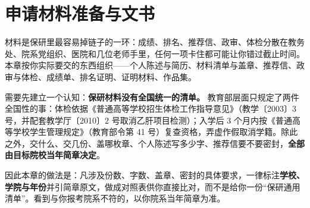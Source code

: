 \chapter{申请材料准备与文书}
\label{ch05}
\begin{keybox}
材料是保研里最容易掉链子的一环：成绩、排名、推荐信、政审、体检分散在教务处、院系党组织、医院和几位老师手里，任何一项卡住都可能让你错过截止时间。本章按你实际要交的东西组织——个人陈述与简历、材料清单与盖章、推荐信、政审与体检、成绩单、排名证明、证明材料、作品集。

需要先建立一个认知：\textbf{保研材料没有全国统一的清单。} 教育部层面只规定了两件全国性的事：体检依据《普通高等学校招生体检工作指导意见》（教学〔2003〕3 号，并配套教学厅〔2010〕2 号取消乙肝项目检测）；入学后 3 个月内按《普通高等学校学生管理规定》（教育部令第 41 号）复查资格，弄虚作假取消学籍。除此之外，交什么、交几份、盖哪枚章、个人陈述写多少字、推荐信要不要密封，\textbf{全部由目标院校当年简章决定}。

因此本章的做法是：凡涉及份数、字数、盖章、密封的具体要求，一律标注\textbf{学校、学院与年份}并引简章原文，做成对照表供你直接比对，而不是给你一份“保研通用清单”。看到与你报考院系不符的，以你院系当年简章为准。
\end{keybox}

